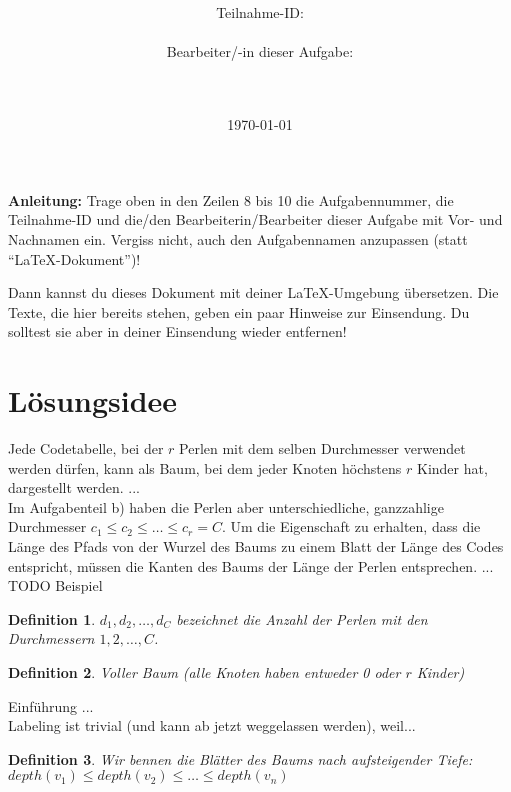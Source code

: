 \documentclass[a4paper,10pt,ngerman]{scrartcl}
\title{\textbf{\Huge\Aufgabe}}
\author{\LARGE Teilnahme-ID: \LARGE \TeilnahmeId \\\\
	    \LARGE Bearbeiter/-in dieser Aufgabe: \\ 
	    \LARGE \Name\\\\}
\date{\LARGE\today}
\newtheorem{definition}{Definition}
\begin{document}
\maketitle
\tableofcontents

\vspace{0.5cm}

\textbf{Anleitung:} Trage oben in den Zeilen 8 bis 10 die Aufgabennummer, die Teilnahme-ID und die/den Bearbeiterin/Bearbeiter dieser Aufgabe mit Vor- und Nachnamen ein.
Vergiss nicht, auch den Aufgabennamen anzupassen (statt "`\LaTeX-Dokument"')!

Dann kannst du dieses Dokument mit deiner \LaTeX-Umgebung übersetzen.
Die Texte, die hier bereits stehen, geben ein paar Hinweise zur
Einsendung. Du solltest sie aber in deiner Einsendung wieder entfernen!

\section{Lösungsidee}
Jede Codetabelle, bei der $r$ Perlen mit dem selben Durchmesser verwendet werden dürfen, kann als Baum, bei dem jeder Knoten höchstens $r$ Kinder hat, dargestellt werden. ... \\

Im Aufgabenteil b) haben die Perlen aber unterschiedliche, ganzzahlige Durchmesser $c_1 \le c_2 \le \dots \le c_r = C$. Um die Eigenschaft zu erhalten, dass die Länge des Pfads von der Wurzel des Baums zu einem Blatt der Länge des Codes entspricht, müssen die Kanten des Baums der Länge der Perlen entsprechen. ... \\
TODO Beispiel \\

\begin{definition}
    $d_1, d_2, \dots, d_C$ bezeichnet die Anzahl der Perlen mit den Durchmessern $1, 2, \dots, C$.
\end{definition}

\begin{definition}
    Voller Baum (alle Knoten haben entweder 0 oder $r$ Kinder) \\
\end{definition}



Einführung ... \\
Labeling ist trivial (und kann ab jetzt weggelassen werden), weil... \\
\begin{definition}
    Wir bennen die Blätter des Baums nach aufsteigender Tiefe:
    $depth(v_1) \le depth(v_2) \le \dots \le depth(v_n)$
\end{definition}
\end{document}
